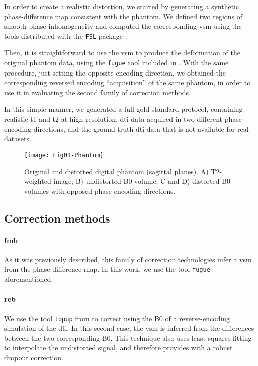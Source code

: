 In order to create a realistic distortion, we started
by generating a synthetic phase-difference map 
consistent with the phantom.  We defined two regions 
of smooth phase inhomogeneity and computed the 
corresponding \gls*{vsm} using the tools distributed 
with the \texttt{FSL} package \cite{jenkinson_fsl_2012}.

Then, it is straightforward to use the \gls*{vsm} to 
produce the deformation of the original phantom data,
using the \texttt{fugue} tool included in
\cite{jenkinson_fsl_2012}. With the same procedure,
just setting the opposite encoding direction, we obtained
the corresponding reversed encoding ``acquisition'' of
the same phantom, in order to use it in evaluating the
second family of correction methods.

In this simple manner, we generated a full gold-standard
protocol, containing realistic \gls*{t1} and \gls*{t2}
at high resolution, \gls*{dti} data acquired in two
different phase encoding directions, and the ground-truth
\gls*{dti} data that is not available for real datasets.


\begin{figure}[thpb]
   \centering
   \texttt{[image: Fig01-Phantom]}
   \caption{Original and distorted digital phantom (sagittal
   planes). A) T2-weighted image; B) undistorted B0 volume;
   C and D) distorted B0 volumes with opposed phase encoding 
   directions.}
   \label{fig:label}
\end{figure}

\subsection{Correction methods}

\paragraph*{\Gls*{fmb}} As it was previously described,
this family of correction technologies infer a \gls*{vsm}
from the phase difference map. In this work, we use the
tool \texttt{fugue} \cite{jenkinson_fsl_2012} aforementioned.

\paragraph*{\Gls*{reb}} We use the tool
\texttt{topup} from \cite{jenkinson_fsl_2012} to correct
using the B0 of a reverse-encoding simulation of the \gls*{dti}.
In this second case, the \gls*{vsm} is inferred from the
differences between the two corresponding B0. This technique
also uses least-squares-fitting to interpolate the undistorted
signal, and therefore provides with a robust dropout correction.


